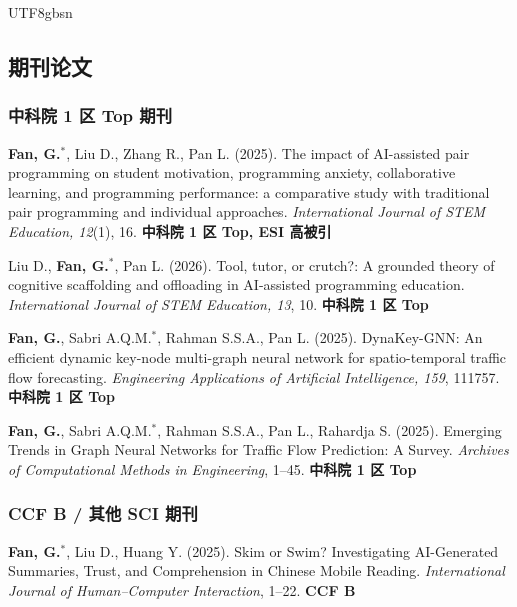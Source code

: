 \documentclass[a4paper,10pt]{article}
\newcommand{\pubitem}[1]{\item #1}
\begin{document}
\begin{CJK*}{UTF8}{gbsn}
\begin{enumerate}[label={[C\arabic*]}, resume]
\end{enumerate}



\subsection*{期刊论文}

\subsubsection*{中科院 1 区 Top 期刊}

\begin{enumerate}[label={[J\arabic*]}]
    \pubitem{\textbf{Fan, G.}$^*$, Liu D., Zhang R., Pan L. (2025). The impact of AI-assisted pair programming on student motivation, programming anxiety, collaborative learning, and programming performance: a comparative study with traditional pair programming and individual approaches. \textit{International Journal of STEM Education, 12}(1), 16. \textbf{中科院 1 区 Top, ESI 高被引}}
    
    \pubitem{Liu D., \textbf{Fan, G.}$^*$, Pan L. (2026). Tool, tutor, or crutch?: A grounded theory of cognitive scaffolding and offloading in AI-assisted programming education. \textit{International Journal of STEM Education, 13}, 10. \textbf{中科院 1 区 Top}}
    
    \pubitem{\textbf{Fan, G.}, Sabri A.Q.M.$^*$, Rahman S.S.A., Pan L. (2025). DynaKey-GNN: An efficient dynamic key-node multi-graph neural network for spatio-temporal traffic flow forecasting. \textit{Engineering Applications of Artificial Intelligence, 159}, 111757. \textbf{中科院 1 区 Top}}
    
    \pubitem{\textbf{Fan, G.}, Sabri A.Q.M.$^*$, Rahman S.S.A., Pan L., Rahardja S. (2025). Emerging Trends in Graph Neural Networks for Traffic Flow Prediction: A Survey. \textit{Archives of Computational Methods in Engineering}, 1--45. \textbf{中科院 1 区 Top}}

\end{enumerate}

\subsubsection*{CCF B / 其他 SCI 期刊}

\begin{enumerate}[label={[J\arabic*]}, resume]
    \pubitem{\textbf{Fan, G.}$^*$, Liu D., Huang Y. (2025). Skim or Swim? Investigating AI-Generated Summaries, Trust, and Comprehension in Chinese Mobile Reading. \textit{International Journal of Human--Computer Interaction}, 1--22. \textbf{CCF B}}
\end{enumerate}


\end{CJK*}
\end{document}
